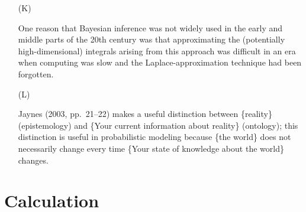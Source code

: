 \documentclass[12pt]{article}
\begin{document}
\begin{itemize}
\item[(K)]

One reason that Bayesian inference was not widely used in the early and middle parts of
the 20th century was that approximating the (potentially high-dimensional)
integrals arising from this approach was difficult in an era when computing
was slow and the Laplace-approximation technique had been forgotten.

\item[(L)]

Jaynes (2003, pp.~21--22) makes a useful distinction between
\{reality\} (epistemology) and \{Your current information about reality\}
(ontology); this distinction is useful in probabilistic modeling because
\{the world\} does not necessarily change every time \{Your state of
knowledge about the world\} changes.

\end{itemize}

\section{Calculation}
\end{document}
